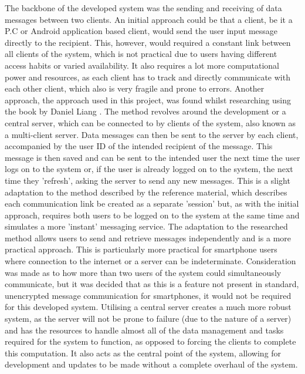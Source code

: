 \documentclass[a4paper,10pt]{report}
\begin{document}
The backbone of the developed system was the sending and receiving of data messages between two clients. An initial approach could be that a client, be it a P.C or Android application based client, would send the user input message directly to the recipient. This, however, would required a constant link between all clients of the system, which is not practical due to users having different access habits or varied availability. It also requires a lot more computational power and resources, as each client has to track and directly communicate with each other client, which also is very fragile and prone to errors. Another approach, the approach used in this project, was found whilst researching using the book by Daniel Liang \cite{ydanielliang}. The method revolves around the development or a central server, which can be connected to by clients of the system, also known as a multi-client server. Data messages can then be sent to the server by each client, accompanied by the user ID of the intended recipient of the message. This message is then saved and can be sent to the intended user the next time the user logs on to the system or, if the user is already logged on to the system, the next time they 'refresh', asking the server to send any new messages. This is a slight adaptation to the method described by the reference material, which describes each communication link be created as a separate 'session' but, as with the initial approach, requires both users to be logged on to the system at the same time and simulates a more 'instant' messaging service. The adaptation to the researched method allows users to send and retrieve messages independently and is a more practical approach. This is particularly more practical for smartphone users where connection to the internet or a server can be indeterminate. Consideration was made as to how more than two users of the system could simultaneously communicate, but it was decided that as this is a feature not present in standard, unencrypted message communication for smartphones, it would not be required for this developed system. Utilising a central server creates a much more robust system, as the server will not be prone to failure (due to the nature of a server) and has the resources to handle almost all of the data management and tasks required for the system to function, as opposed to forcing the clients to complete this computation. It also acts as the central point of the system, allowing for development and updates to be made without a complete overhaul of the system. 
\end{document}
